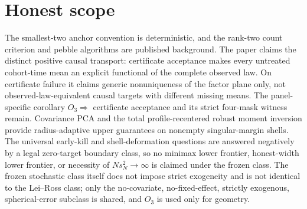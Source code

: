\documentclass{article}
\begin{document}
\section{Honest scope}

The smallest-two anchor convention is deterministic, and the rank-two count criterion and pebble algorithms are published background. The paper claims the distinct positive causal transport: certificate acceptance makes every untreated cohort-time mean an explicit functional of the complete observed law. On certificate failure it claims generic nonuniqueness of the factor plane only, not observed-law-equivalent causal targets with different missing means. The panel-specific corollary \(O_3\Rightarrow\) certificate acceptance and its strict four-mask witness remain. Covariance PCA and the total profile-recentered robust moment inversion provide radius-adaptive upper guarantees on nonempty singular-margin shells. The universal early-kill and shell-deformation questions are answered negatively by a legal zero-target boundary class, so no minimax lower frontier, honest-width lower frontier, or necessity of \(Ns_N^2\to\infty\) is claimed under the frozen class. The frozen stochastic class itself does not impose strict exogeneity and is not identical to the Lei--Ross class; only the no-covariate, no-fixed-effect, strictly exogenous, spherical-error subclass is shared, and \(O_3\) is used only for geometry.
\end{document}
